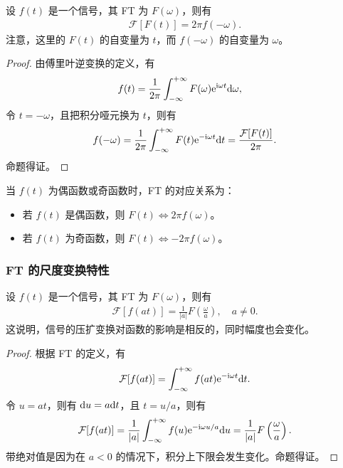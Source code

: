 \begin{property}
    设 $f(t)$ 是一个信号，其 FT 为 $F(\omega)$，则有
    \begin{align*}
        \mathcal{F}[F(t)] = 2\pi f(-\omega).
    \end{align*}
    注意，这里的 $F(t)$ 的自变量为 $t$，而 $f(-\omega)$ 的自变量为 $\omega$。
\end{property}

\begin{proof}
    由傅里叶逆变换的定义，有
    \begin{align*}
        f(t) & = \frac{1}{2\pi}\int_{-\infty}^{+\infty} F(\omega)\mathrm{e}^{\mathrm{i}\omega t}\mathrm{d}\omega,
    \end{align*}
    令 $t = -\omega$，且把积分哑元换为 $t$，则有
    \begin{align*}
        f(-\omega) = \frac{1}{2\pi}\int_{-\infty}^{+\infty} F(t)\mathrm{e}^{-\mathrm{i}\omega t}\mathrm{d}t = \frac{\mathcal{F}[F(t)]}{2\pi}.
    \end{align*}
    命题得证。
\end{proof}

\begin{corollary}
    当 $f(t)$ 为偶函数或奇函数时，FT 的对应关系为：
    \begin{itemize}
        \item 若 $f(t)$ 是偶函数，则 $F(t) \iff 2\pi f(\omega)$。
        \item 若 $f(t)$ 为奇函数，则 $F(t) \iff -2\pi f(\omega)$。
    \end{itemize}
\end{corollary}

\subsubsection{FT 的尺度变换特性}

\begin{property}
    设 $f(t)$ 是一个信号，其 FT 为 $F(\omega)$，则有
    \begin{align*}
        \mathcal{F}[f(at)] = \frac{1}{|a|}F\left(\frac{\omega}{a}\right), \quad a \neq 0.
    \end{align*}
    这说明，信号的压扩变换对函数的影响是相反的，同时幅度也会变化。
\end{property}

\begin{proof}
    根据 FT 的定义，有
    \begin{align*}
        \mathcal{F}[f(at)] = \int_{-\infty}^{+\infty} f(at)\mathrm{e}^{-\mathrm{i}\omega t}\mathrm{d}t.
    \end{align*}
    令 $u = at$，则有 $\mathrm{d}u = a\mathrm{d}t$，且 $t = u/a$，则有
    \begin{align*}
        \mathcal{F}[f(at)] = \frac{1}{|a|}\int_{-\infty}^{+\infty} f(u)\mathrm{e}^{-\mathrm{i}\omega u/a}\mathrm{d}u = \frac{1}{|a|}F\left(\frac{\omega}{a}\right).
    \end{align*}
    带绝对值是因为在 $a < 0$ 的情况下，积分上下限会发生变化。命题得证。
\end{proof}

